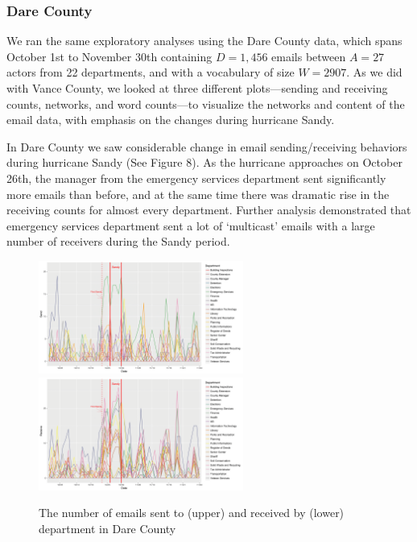 \documentclass[a4paper]{article}
\begin{document}
   \subsubsection{Dare County}\label{subsubsec:DareEDA}
    We ran the same exploratory analyses using the Dare County data, which spans October 1st to November 30th containing $D=1,456$ emails between $A=27$ actors from 22 departments, and with a vocabulary of size $W=2907$. As we did with Vance County, we looked at three different plots---sending and receiving counts, networks, and word counts---to visualize the networks and content of the email data, with emphasis on the changes during hurricane Sandy.
    
    In Dare County we saw considerable change in email sending/receiving behaviors during hurricane Sandy (See Figure 8). As the hurricane approaches on October 26th, the manager from the emergency services department sent significantly more emails than before, and at the same time there was dramatic rise in the receiving counts for almost every department. Further analysis demonstrated that emergency services department sent a lot of `multicast' emails with a large number of receivers during the Sandy period. 
        \begin{figure}[H]
       	\centering
       	\includegraphics[width=0.6\textwidth]{plots/DareSend-1.png} 
       	\includegraphics[width=0.6\textwidth]{plots/DareReceive-1.png} 
       	\label{fig:SendReceiveDare}
       	\caption{The number of emails sent to (upper) and received by (lower) department in Dare County}
       \end{figure}
    
\end{document}
